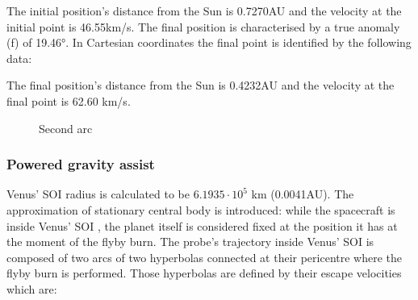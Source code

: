 \documentclass[11pt,a4paper]{report}
\begin{document}
The initial position’s distance from the Sun is 0.7270AU and the velocity at the initial point is 46.55km/s.
The final position is characterised by a true anomaly (f) of 19.46°. In Cartesian coordinates the final point is identified by the following data:

\begin{table}[H]
\centering
{}
\end{table}
The final position’s distance from the Sun is 0.4232AU and the velocity at the final point is 62.60 km/s.

\begin{figure}[H]
\centering
{}
    \caption{Second arc}
\end{figure}


\subsubsection{Powered gravity assist}

Venus’ SOI radius is calculated to be $6.1935\cdot10^{5}$ km (0.0041AU).
The approximation of stationary central body is introduced: while the spacecraft is inside Venus’ SOI , the planet itself is considered fixed at the position it has at the moment of the flyby burn.
The probe’s trajectory inside Venus’ SOI is composed of two arcs of two hyperbolas connected at their pericentre where the flyby burn is performed. Those hyperbolas are defined by their escape velocities which are:

\begin{table}[H]
\centering
{}
\end{table}
\end{document}
